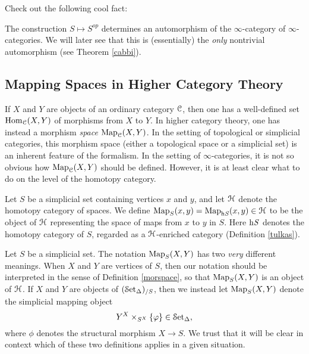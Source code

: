 \begin{1.2.1 Opposite of an inf-cat}
\begin{shaded}
Check out the following cool fact:
\end{shaded}

The construction $S \mapsto S^{op}$ determines an automorphism of the $\infty$-category
of $\infty$-categories. We will later see that this is (essentially) the {\em only} nontrivial automorphism
(see Theorem \ref{cabbi}).
\end{1.2.1 Opposite of an inf-cat}
\subsection{Mapping Spaces in Higher Category Theory}\label{prereq1}
\begin{1.2.2 Mapping spaces}

If $X$ and $Y$ are objects of an ordinary category $\operatorname{\mathcal{C}}$, then one has a well-defined
set $\operatorname{Hom}_{\operatorname{\mathcal{C}}}(X,Y)$ of morphisms from $X$ to $Y$. In higher category theory, one has instead a morphism {\em space} $\operatorname{{Map}}_{\operatorname{\mathcal{C}}}(X,Y)$. In the setting of topological or simplicial
categories, this morphism space (either a topological space or a simplicial set) is an inherent feature of the formalism. In the setting of $\infty$-categories, it is not so obvious
how $\operatorname{{Map}}_{\operatorname{\mathcal{C}}}(X,Y)$ should be defined. However, it is at least clear what to do on the level of the homotopy category.

\begin{definition}\label{morspace}
Let $S$ be a simplicial set containing vertices $x$ and $y$, and let
$\operatorname{\mathcal{H}}$ denote the homotopy category of spaces. We define
$\operatorname{{Map}}_{S}(x,y) = \operatorname{{Map}}_{\rm{h} \it{S}}(x,y) \in \operatorname{\mathcal{H}}$ to be the object of $\operatorname{\mathcal{H}}$ representing
the space of maps from $x$ to $y$ in $S$. Here $\rm{h} \it{S}$ denotes the homotopy category of $S$, regarded as a $\operatorname{\mathcal{H}}$-enriched category (Definition \ref{tulkas}). 
\end{definition}

\begin{warning}
Let $S$ be a simplicial set. The notation $\operatorname{{Map}}_{S}( X, Y)$ has two {\em very} different meanings.
When $X$ and $Y$ are vertices of $S$, then our notation should be interpreted in the sense of Definition \ref{morspace}, so that $\operatorname{{Map}}_{S}(X,Y)$ is an object of $\operatorname{\mathcal{H}}$. If $X$ and $Y$ are objects of $(\operatorname{\mathcal{S}et_{\Delta}})_{/S}$, then we instead let $\operatorname{{Map}}_{S}(X,Y)$ denote the simplicial mapping object
$$ Y^{X} \times_{ S^{X} } \{ \varphi \} \in \operatorname{\mathcal{S}et_{\Delta}},$$
where $\phi$ denotes the structural morphism $X \rightarrow S$. We trust that it will be clear in context which of these two definitions applies in a given situation.
\end{warning}


\end{1.2.2 Mapping spaces}
